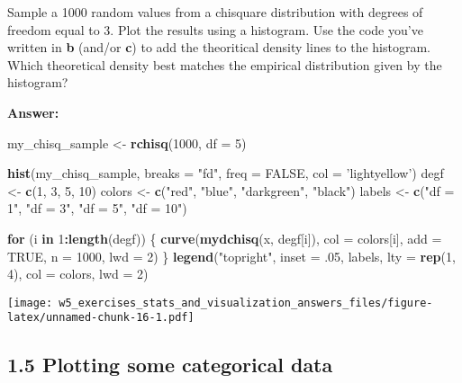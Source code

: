 \documentclass[]{article}
\newenvironment{Shaded}{\begin{snugshade}}{\end{snugshade}}
\newcommand{\ControlFlowTok}[1]{\textcolor[rgb]{0.13,0.29,0.53}{\textbf{#1}}}
\newcommand{\DataTypeTok}[1]{\textcolor[rgb]{0.13,0.29,0.53}{#1}}
\newcommand{\DecValTok}[1]{\textcolor[rgb]{0.00,0.00,0.81}{#1}}
\newcommand{\FloatTok}[1]{\textcolor[rgb]{0.00,0.00,0.81}{#1}}
\newcommand{\KeywordTok}[1]{\textcolor[rgb]{0.13,0.29,0.53}{\textbf{#1}}}
\newcommand{\NormalTok}[1]{#1}
\newcommand{\OperatorTok}[1]{\textcolor[rgb]{0.81,0.36,0.00}{\textbf{#1}}}
\newcommand{\OtherTok}[1]{\textcolor[rgb]{0.56,0.35,0.01}{#1}}
\newcommand{\StringTok}[1]{\textcolor[rgb]{0.31,0.60,0.02}{#1}}
\begin{document}
Sample a 1000 random values from a chisquare distribution with degrees
of freedom equal to 3. Plot the results using a histogram. Use the code
you've written in \textbf{b} (and/or \textbf{c}) to add the theoritical
density lines to the histogram. Which theoretical density best matches
the empirical distribution given by the histogram?

\textbf{Answer:}

\begin{Shaded}
\begin{Highlighting}[]
\NormalTok{my_chisq_sample <-}\StringTok{ }\KeywordTok{rchisq}\NormalTok{(}\DecValTok{1000}\NormalTok{, }\DataTypeTok{df =} \DecValTok{5}\NormalTok{)}

\KeywordTok{hist}\NormalTok{(my_chisq_sample, }\DataTypeTok{breaks =} \StringTok{"fd"}\NormalTok{, }\DataTypeTok{freq =} \OtherTok{FALSE}\NormalTok{, }\DataTypeTok{col =} \StringTok{'lightyellow'}\NormalTok{)}
\NormalTok{degf <-}\StringTok{ }\KeywordTok{c}\NormalTok{(}\DecValTok{1}\NormalTok{, }\DecValTok{3}\NormalTok{, }\DecValTok{5}\NormalTok{, }\DecValTok{10}\NormalTok{)}
\NormalTok{colors <-}\StringTok{ }\KeywordTok{c}\NormalTok{(}\StringTok{"red"}\NormalTok{, }\StringTok{"blue"}\NormalTok{, }\StringTok{"darkgreen"}\NormalTok{, }\StringTok{"black"}\NormalTok{)}
\NormalTok{labels <-}\StringTok{ }\KeywordTok{c}\NormalTok{(}\StringTok{"df = 1"}\NormalTok{, }\StringTok{"df = 3"}\NormalTok{, }\StringTok{"df = 5"}\NormalTok{, }\StringTok{"df = 10"}\NormalTok{)}

\ControlFlowTok{for}\NormalTok{ (i }\ControlFlowTok{in} \DecValTok{1}\OperatorTok{:}\KeywordTok{length}\NormalTok{(degf)) \{}
  \KeywordTok{curve}\NormalTok{(}\KeywordTok{mydchisq}\NormalTok{(x, degf[i]), }\DataTypeTok{col =}\NormalTok{ colors[i], }\DataTypeTok{add =} \OtherTok{TRUE}\NormalTok{, }\DataTypeTok{n =} \DecValTok{1000}\NormalTok{, }\DataTypeTok{lwd =} \DecValTok{2}\NormalTok{)}
\NormalTok{\}}
\KeywordTok{legend}\NormalTok{(}\StringTok{"topright"}\NormalTok{, }\DataTypeTok{inset =} \FloatTok{.05}\NormalTok{, labels, }\DataTypeTok{lty =} \KeywordTok{rep}\NormalTok{(}\DecValTok{1}\NormalTok{, }\DecValTok{4}\NormalTok{), }\DataTypeTok{col =}\NormalTok{ colors, }\DataTypeTok{lwd =} \DecValTok{2}\NormalTok{)}
\end{Highlighting}
\end{Shaded}

\texttt{[image: w5\_exercises\_stats\_and\_visualization\_answers\_files/figure-latex/unnamed-chunk-16-1.pdf]}

\hypertarget{plotting-some-categorical-data}{%
\subsection{1.5 Plotting some categorical
data}\label{plotting-some-categorical-data}}
\end{document}
